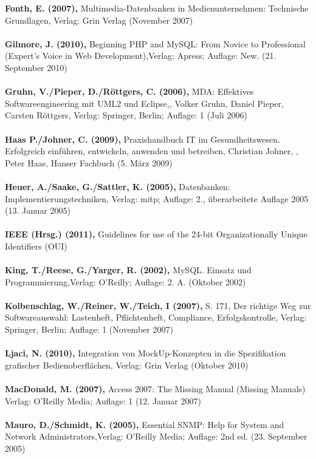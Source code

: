 \textbf{Fonth, E. (2007),} Multimedia-Datenbanken in Medienunternehmen: Technische Grundlagen, Verlag: Grin Verlag (November 2007)\\\\
\textbf{Gilmore, J. (2010),} Beginning PHP and MySQL: From Novice to Professional (Expert's Voice in Web Development),Verlag: Apress; Auflage: New. (21. September 2010)\\\\
\textbf{Gruhn, V./Pieper, D./Röttgers, C. (2006),} MDA: Effektives Softwareengineering mit UML2 und Eclipse,, Volker Gruhn, Daniel Pieper, Carsten Röttgers, Verlag: Springer, Berlin; Auflage: 1 (Juli 2006)\\\\
\textbf{Haas P./Johner, C. (2009),} Praxishandbuch IT im Gesundheitswesen. Erfolgreich einführen, entwickeln, anwenden und betreiben, Christian Johner, , Peter Haas, Hanser Fachbuch (5. März 2009)\\\\
\textbf{Heuer, A./Saake, G./Sattler, K. (2005),} Datenbanken: Implementierungstechniken, Verlag: mitp; Auflage: 2., überarbeitete Auflage 2005 (13. Januar 2005)\\\\
\textbf{IEEE (Hrsg.) (2011),} Guidelines for use of the 24-bit Organizationally Unique Identifiers (OUI)\\\\
\textbf{King, T./Reese, G./Yarger, R. (2002),} MySQL. Einsatz und Programmierung,Verlag: O'Reilly; Auflage: 2. A. (Oktober 2002)\\\\
\textbf{Kolbenschlag, W./Reiner, W./Teich, I (2007),} S. 171, Der richtige Weg zur Softwareauswahl: Lastenheft, Pflichtenheft, Compliance, Erfolgskontrolle, Verlag: Springer, Berlin; Auflage: 1 (November 2007)\\\\
\textbf{Ljaci, N. (2010),} Integration von MockUp-Konzepten in die Spezifikation grafischer Bedienoberflächen, Verlag: Grin Verlag (Oktober 2010)\\\\
\textbf{MacDonald, M. (2007),} Access 2007: The Missing Manual (Missing Manuals) Verlag: O'Reilly Media; Auflage: 1 (12. Januar 2007)\\\\
\textbf{Mauro, D./Schmidt, K. (2005),} Essential SNMP: Help for System and Network Administrators,Verlag: O'Reilly Media; Auflage: 2nd ed. (23. September 2005)\\\\
